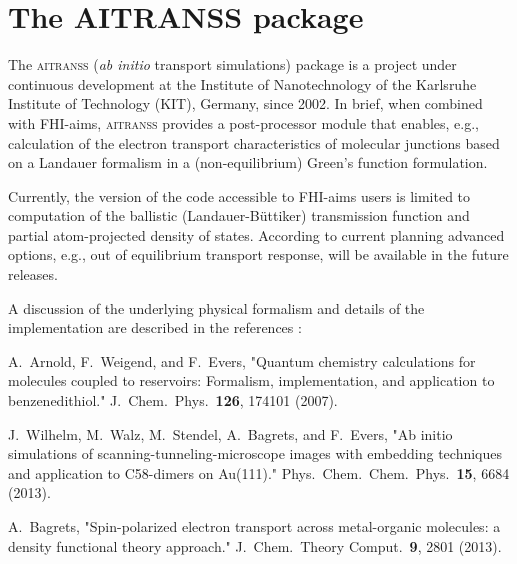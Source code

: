 \documentclass[12pt,a4paper,twoside,openany,titlepage,final]{book}
\begin{document}














%











\chapter[The AITRANSS package]{The {\LARGE AITRANSS} package}
\label{Ch:aitranss}

The \textsc{aitranss} ({\it ab initio} transport simulations) package is 
a project under continuous development at the Institute of Nanotechnology 
of the Karlsruhe Institute of Technology (KIT), Germany, since 2002. In 
brief, when combined with FHI-aims, \textsc{aitranss} provides a 
post-processor module that enables, e.g., calculation of the electron 
transport characteristics of molecular junctions based on a Landauer 
formalism in a (non-equilibrium) Green's function formulation.

Currently, the version of the code accessible to FHI-aims users is
limited to computation of the ballistic (Landauer-B\"uttiker) transmission
function and partial atom-projected density of states. 
According to current planning advanced options, e.g., out of
equilibrium transport response, will be available in the future releases.

A discussion of the underlying physical formalism and details of the
implementation are described in the references \cite{Arnold2007,Wilhelm2013,Bagrets2013}:

\begin{center}
\parbox[c]{0.85\textwidth}
{\small
A.\ Arnold, F.\ Weigend, and F.\ Evers,
"Quantum chemistry calculations for molecules coupled to reservoirs:
Formalism, implementation, and application to benzenedithiol."
J.\ Chem.\ Phys.\ \textbf{126}, 174101 (2007).
}
\medskip

\parbox[c]{0.85\textwidth}
{\small
J.\ Wilhelm, M.\ Walz, M.\ Stendel, A.\ Bagrets, and F.\ Evers,
"Ab initio simulations of scanning-tunneling-microscope
images with embedding techniques and application to C58-dimers 
on Au(111)." Phys.\ Chem.\ Chem.\ Phys.\ \textbf{15}, 6684 (2013).
}
\medskip

\parbox[c]{0.85\textwidth}
{\small
A.\ Bagrets, "Spin-polarized electron transport across metal-organic 
molecules: a density functional theory approach." 
J.\ Chem.\ Theory Comput.\ \textbf{9}, 2801 (2013).
}
\medskip

\end{center}
\end{document}
